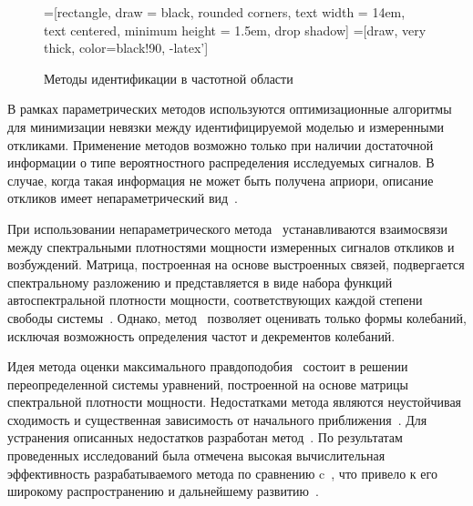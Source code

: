 \begin{figure}[H]
	\centering
	=[rectangle, draw = black, rounded corners, text width = 14em, text centered, minimum height = 1.5em, drop shadow]
	=[draw, very thick, color=black!90, -latex']
	\caption{Методы идентификации в частотной области~\cite{lib:oma:Nilsson}} \label{fig:schemeFrequencyDomainOMA}
\end{figure}

В рамках параметрических методов используются оптимизационные алгоритмы для минимизации невязки между идентифицируемой моделью и измеренными откликами. Применение методов возможно только при наличии достаточной информации о типе вероятностного распределения исследуемых сигналов. В случае, когда такая информация не может быть получена априори, описание откликов имеет непараметрический вид~\cite{lib:oma:Peeters&Roeck}. 

При использовании непараметрического метода~ устанавливаются взаимосвязи между спектральными плотностями мощности измеренных сигналов откликов и возбуждений. Матрица, построенная на основе выстроенных связей, подвергается спектральному разложению и представляется в виде набора функций автоспектральной плотности мощности, соответствующих каждой степени свободы системы~\cite{lib:oma:Cardenas}. Однако, метод~ позволяет оценивать только формы колебаний, исключая возможность определения частот и декрементов колебаний.

Идея метода оценки максимального правдоподобия~ состоит в решении переопределенной системы уравнений, построенной на основе матрицы спектральной плотности мощности. Недостатками метода являются неустойчивая сходимость и существенная зависимость от начального приближения~\cite{lib:oma:Hermans}. Для устранения описанных недостатков разработан метод~. По результатам проведенных исследований была отмечена высокая вычислительная эффективность разрабатываемого метода по сравнению c~, что привело к его широкому распространению и дальнейшему развитию~\cite{lib:oma:Verboven}.

